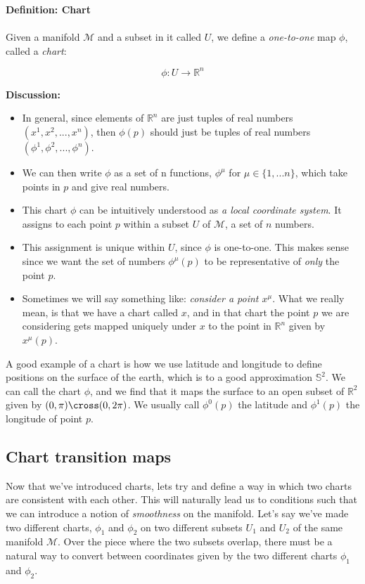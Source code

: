\documentclass[10pt]{article}
\begin{document}
\begin{tcolorbox}
\textbf{Definition: Chart} \\ \\ 
Given a manifold $\mathcal{M}$ and a subset in it called $U$, we define a \textit{one-to-one} map $\phi$, called a \textit{chart}:

\begin{equation*}
    \phi: U \rightarrow \mathbb{R}^n
\end{equation*}

\textbf{Discussion:} \\
\begin{itemize}
    \item In general, since elements of $\mathbb{R}^n$ are just tuples of real numbers $(x^1,x^2,...,x^n)$, then $\phi(p)$ should just be tuples of real numbers $(\phi^1,\phi^2,...,\phi^n)$.
    \item  We can then write $\phi$ as a set of n functions, $\phi^{\mu}$ for $\mu \in \{1,...n\}$, which take points in $p$ and give real numbers. 
    \item This chart $\phi$ can be intuitively understood as \textit{a local coordinate system}. It assigns to each point $p$ within a subset $U$ of $\mathcal{M}$, a set of $n$ numbers.
    \item This assignment is unique within $U$, since $\phi$ is one-to-one. This makes sense since we want the set of numbers $\phi^{\mu}(p)$ to be representative of \textit{only} the point $p$.
    \item Sometimes we will say something like: \textit{consider a point $x^\mu$}. What we really mean, is that we have a chart called $x$, and in that chart the point $p$ we are considering gets mapped uniquely under $x$ to the point in $\mathbb{R}^n$ given by $x^{\mu}(p)$.
\end{itemize}

\end{tcolorbox}

A good example of a chart is how we use latitude and longitude to define positions on the surface of the earth, which is to a good approximation $\mathbb{S}^2$. We can call the chart $\phi$, and we find that it maps the surface to an open subset of $\mathbb{R}^2$ given by $(0,\pi)\cross(0,2\pi)$. We usually call $\phi^{0}(p)$ the latitude and $\phi^{1}(p)$ the longitude of point $p$.

\subsection{Chart transition maps}
Now that we've introduced charts, lets try and define a way in which two charts are consistent with each other. This will naturally lead us to conditions such that we can introduce a notion of \textit{smoothness} on the manifold. Let's say we've made two different charts, $\phi_1$ and $\phi_2$ on two different subsets $U_1$ and $U_2$ of the same manifold $\mathcal{M}$. Over the piece where the two subsets overlap, there must be a natural way to convert between coordinates given by the two different charts $\phi_1$ and $\phi_2$. 
\end{document}
